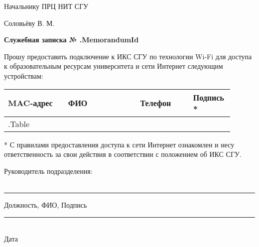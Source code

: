 \documentclass[12pt]{article}
\begin{document}
\begin{flushright}
Начальнику ПРЦ НИТ СГУ

Соловьёву В. М. \\[50pt]
\end{flushright}

\begin{center}
\large
\textbf{Служебная записка № {{.MemorandumId}} } \\[20pt]
\end{center}
\begin{flushleft}
\large
Прошу предоставить подключение к ИКС СГУ по технологии Wi-Fi для доступа к образовательным ресурсам университета и сети Интернет следующим устройствам:
\end{flushleft}




\begin{table}[!h]
\large
\centering
\label{my-label}
\begin{tabular}{|p{0.25\linewidth}|p{0.3\linewidth}|p{0.22\linewidth}|p{0.135\linewidth}|}
\hline
MAC-адрес & ФИО & Телефон & Подпись *  \\
\hline
{{.Table}}
\end{tabular}
\end{table}


\small
* С правилами предоставления доступа к сети Интернет ознакомлен и несу ответственность за свои действия в соответствии с положением об ИКС СГУ. \\[30pt]
\normalsize
\begin{flushleft}
\large
Руководитель подразделения:\\~\\
\end{flushleft}
\centering
\noindent\rule{550pt}{0.4pt}
\large
Должность, ФИО, Подпись\\[50pt]

\begin{flushright}
\normalsize
\noindent\rule{100pt}{0.4pt} \\
Дата           
\end{flushright}
\end{document}
